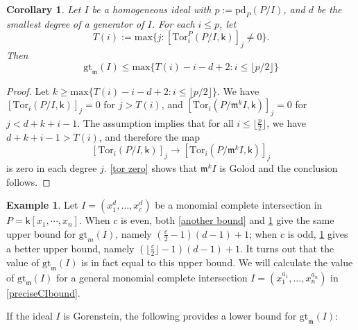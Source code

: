 \documentclass[10pt,reqno]{amsart}
\newtheorem{corollary}[subsection]{Corollary}
\theoremstyle{definition}
\newtheorem{example}[subsection]{Example}
\theoremstyle{remark}
\numberwithin{equation}{section}
\newcommand{\Tor}{\mathrm{Tor}}
\newcommand{\reg}{\mathrm{reg}}
\newcommand{\kk}{\mathsf k}
\newcommand{\m}{\mathfrak m}
\numberwithin{equation}{section}
\begin{document}
\begin{corollary}\label{upper bound}
   Let $I$ be a homogeneous ideal with $p:=\mathrm{pd}_P(P/I)$, and $d$ be the smallest degree of a generator of $I$.
For each $i\le p$, let $$T(i):=\mathrm{max}\{j: [\Tor_{i}^P(P/I,\kk)]_j\ne 0\}.$$
   Then
$$
\mathrm{gt}_{\m}(I)\le \mathrm{max}\{T(i)-i-d+2: i \le \lfloor p/2 \rfloor \}
$$ 
\end{corollary}
\begin{proof}
Let $k\ge \mathrm{max}\{T(i)-i-d+2: i \le \lfloor p/2 \rfloor \}$.
  We have $[\mathrm{Tor}_i(P/I, \kk)]_j=0$ for $j>T(i)$, and 
  $[\mathrm{Tor}_i(P/\m^kI, \kk)]_j=0$ for $j<d+k+i-1.$
  The assumption implies that for all $i\le \lfloor \frac{p}{2}\rfloor$, we have $d+k+i-1>T(i)$, and therefore the map
  $$
[\mathrm{Tor}_i(P/I, \kk)]_j\to [\mathrm{Tor}_i(P/\m^kI, \kk)]_j
  $$
  is zero in each degree $j$. \cref{tor zero} shows that $\m^kI$ is Golod and the conclusion follows.
\end{proof}

\begin{example}
Let $I=(x_1^d,\ldots,x_c^d)$ be a monomial complete intersection in $P=\kk[x_{1},\cdots,x_{n}]$. When $c$ is even, both \cref{another bound} and \cref{upper bound} give the same upper bound for $\mathrm{gt}_m(I)$, namely $(\frac{c}{2}-1)(d-1)+1$; when $c$ is odd, \cref{upper bound} gives a better upper bound, namely $(\lfloor \frac{c}{2}\rfloor -1)(d-1)+1$. It turns out that the value of $\mathrm{gt}_{\m}(I)$ is in fact equal to this upper bound. We will calculate the value of $\mathrm{gt}_{\m}(I)$ for a general monomial complete intersection $I=(x_1^{a_1}, \ldots, x_n^{a_n})$ in \cref{preciseCIbound}.


\end{example}

If the ideal $I$ is Gorenstein, the following provides a lower bound for $\mathrm{gt}_{\m}(I)$:
\end{document}
